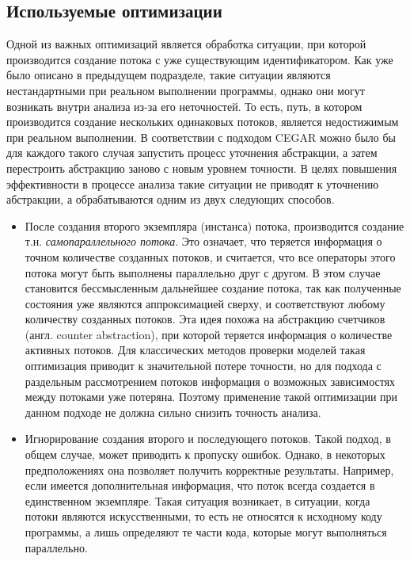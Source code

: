 \subsection{Используемые оптимизации}
\label{sect_thread_create}
Одной из важных оптимизаций является обработка ситуации, при которой производится создание потока с уже существующим идентификатором. 
Как уже было описано в предыдущем подразделе, такие ситуации являются нестандартными при реальном выполнении программы, однако они могут возникать внутри анализа из-за его неточностей.
То есть, путь, в котором производится создание нескольких одинаковых потоков, является недостижимым при реальном выполнении.
В соответствии с подходом CEGAR можно было бы для каждого такого случая запустить процесс уточнения абстракции, а затем перестроить абстракцию заново с новым уровнем точности.
В целях повышения эффективности в процессе анализа такие ситуации не приводят к уточнению абстракции, а обрабатываются одним из двух следующих способов.

\begin{itemize}
\item После создания второго экземпляра (инстанса) потока, производится создание т.н. \textit{самопараллельного потока}.
Это означает, что теряется информация о точном количестве созданных потоков, и считается, что все операторы этого потока могут быть выполнены параллельно друг с другом.
В этом случае становится бессмысленным дальнейшее создание потока, так как полученные состояния уже являются аппроксимацией сверху, и соответствуют любому количеству созданных потоков.
Эта идея похожа на абстракцию счетчиков (англ. counter abstraction), при которой теряется информация о количестве активных потоков.
Для классических методов проверки моделей такая оптимизация приводит к значительной потере точности, но для подхода с раздельным рассмотрением потоков информация о возможных зависимостях между потоками уже потеряна.
Поэтому применение такой оптимизации при данном подходе не должна сильно снизить точность анализа.

\item Игнорирование создания второго и последующего потоков. 
Такой подход, в общем случае, может приводить к пропуску ошибок. 
Однако, в некоторых предположениях она позволяет получить корректные результаты.
Например, если имеется дополнительная информация, что поток всегда создается в единственном экземпляре.
Такая ситуация возникает, в ситуации, когда потоки являются искусственными, то есть не относятся к исходному коду программы, а лишь определяют те части кода, которые могут выполняться параллельно.

\end{itemize}

